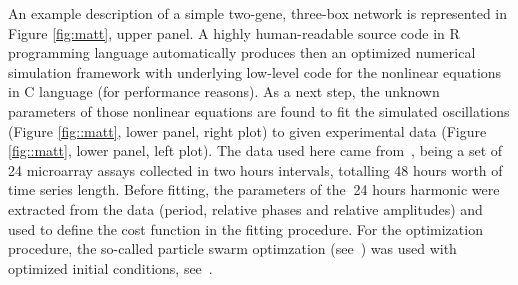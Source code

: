 An example description of a simple two-gene, three-box network is
represented in Figure \ref{fig:matt}, upper panel. A highly
human-readable source code in R programming language automatically
produces then an optimized numerical simulation framework with
underlying low-level code for the nonlinear equations in C language
(for performance reasons). As a next step, the unknown parameters of
those nonlinear equations are found to fit the simulated oscillations
(Figure \ref{fig::matt}, lower panel, right plot) to given
experimental data (Figure \ref{fig::matt}, lower panel, left plot).
The data used here came from~\cite{zhang2014circadian}, being a set of
24 microarray assays collected in two hours intervals, totalling 48
hours worth of time series length. Before fitting, the parameters of
the $~$24 hours harmonic were extracted from the data (period,
relative phases and relative amplitudes) and used to define the cost
function in the fitting procedure. For the optimization procedure, the
so-called particle swarm optimzation (see~\cite{zambrano2012hydropso})
was used with optimized initial conditions,
see~\cite{richards2004choosing}.
